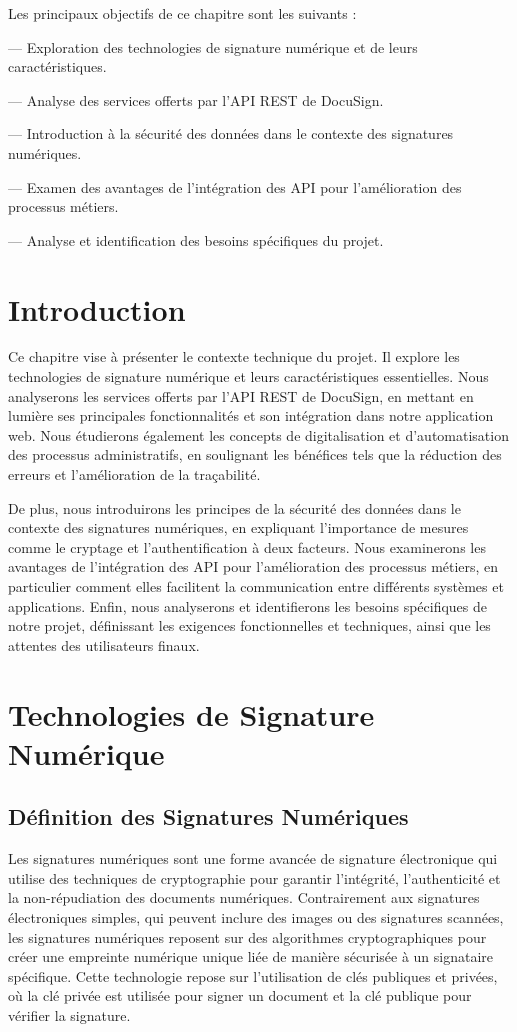 Les principaux objectifs de ce chapitre sont les suivants :

— Exploration des technologies de signature numérique et de leurs caractéristiques.

— Analyse des services offerts par l'API REST de DocuSign.



— Introduction à la sécurité des données dans le contexte des signatures numériques.

— Examen des avantages de l'intégration des API pour l'amélioration des processus métiers.

— Analyse et identification des besoins spécifiques du projet.

\newpage
\section{Introduction}
\quad Ce chapitre vise à présenter le contexte technique du projet. Il explore les technologies de signature numérique et leurs caractéristiques essentielles. Nous analyserons les services offerts par l'API REST de DocuSign, en mettant en lumière ses principales fonctionnalités et son intégration dans notre application web. Nous étudierons également les concepts de digitalisation et d'automatisation des processus administratifs, en soulignant les bénéfices tels que la réduction des erreurs et l'amélioration de la traçabilité.

De plus, nous introduirons les principes de la sécurité des données dans le contexte des signatures numériques, en expliquant l'importance de mesures comme le cryptage et l'authentification à deux facteurs. Nous examinerons les avantages de l'intégration des API pour l'amélioration des processus métiers, en particulier comment elles facilitent la communication entre différents systèmes et applications. Enfin, nous analyserons et identifierons les besoins spécifiques de notre projet, définissant les exigences fonctionnelles et techniques, ainsi que les attentes des utilisateurs finaux.


\section{Technologies de Signature Numérique}
\subsection{ Définition des Signatures Numériques}

Les signatures numériques sont une forme avancée de signature électronique qui utilise des techniques de cryptographie pour garantir l'intégrité, l'authenticité et la non-répudiation des documents numériques. Contrairement aux signatures électroniques simples, qui peuvent inclure des images ou des signatures scannées, les signatures numériques reposent sur des algorithmes cryptographiques pour créer une empreinte numérique unique liée de manière sécurisée à un signataire spécifique. Cette technologie repose sur l'utilisation de clés publiques et privées, où la clé privée est utilisée pour signer un document et la clé publique pour vérifier la signature.

